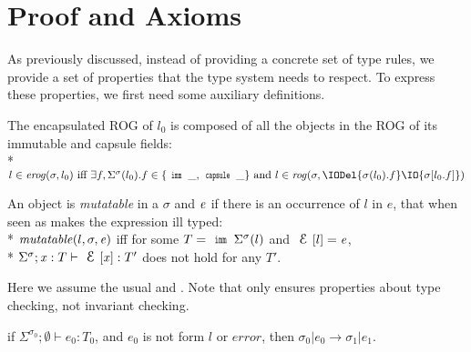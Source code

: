 \clearpage
\section{Proof and Axioms}
\label{s:proof}

As previously discussed, instead of providing a concrete set of type rules, we provide a set of properties
that the type system needs to respect.
To express these properties, we first need some auxiliary definitions.


The encapsulated ROG of $l_0$ is composed of all the objects
in the ROG of its immutable and capsule fields:\\*
\indent $l \in \mathit{erog}(\sigma,l_0)
\text{ iff } \exists f, \Sigma^\sigma(l_0).f \in \{\Kw{imm}\,\_,\Kw{capsule}\,\_\}
\text{ and } l \in \mathit{rog}(\sigma,\IODel{\sigma(l_0).f} \IO{\sigma[l_0.f]})$%

\noindent An object is \emph{mutatable} in a $\sigma$ and  ${\mathit{e}}$ if there is an occurrence of 
$l$ in $e$, that when seen as \Q@imm@ makes the expression ill typed:\\*
\indent $\mathit{mutatable}(l,\sigma,{\mathit{e}})$ iff for some $T=\Kw{imm}\,\Sigma^\sigma(l)$ and $\ctx[l]=\e$,\\*
\indent \indent $\Sigma^\sigma;\x:T\vdash\ctx[\x]:T'$ does not hold for any $T'$.%
{}



Here we assume the usual  and . Note that  only ensures properties about type checking, not invariant checking.\saveSpace\saveSpace
\begin{Assumption}[Progress]\rm
	if $\Sigma^{\sigma_0};\emptyset\vdash e_0: T_0$,
	and $e_0$ is not  form $l$ or $\mathit{error}$, then
	$\sigma_0|e_0\rightarrow \sigma_1|e_1$.
\end{Assumption}

